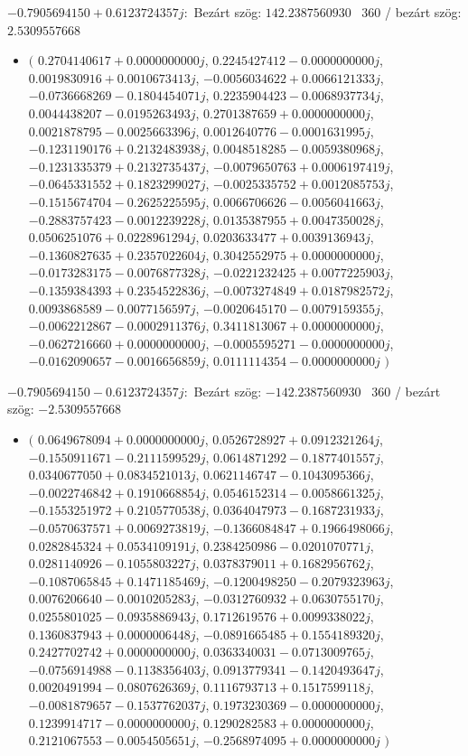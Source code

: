 \documentclass[14pt,a4paper]{article}
\begin{document}
$-0.7905694150+0.6123724357j$:\
Bezárt szög: $142.2387560930$ \
360 / bezárt szög: $2.5309557668$\
\begin{itemize}
\item
$\big($
$0.2704140617+0.0000000000j$, $0.2245427412-0.0000000000j$, $0.0019830916+0.0010673413j$, $-0.0056034622+0.0066121333j$, $-0.0736668269-0.1804454071j$, $0.2235904423-0.0068937734j$, $0.0044438207-0.0195263493j$, $0.2701387659+0.0000000000j$, $0.0021878795-0.0025663396j$, $0.0012640776-0.0001631995j$, $-0.1231190176+0.2132483938j$, $0.0048518285-0.0059380968j$, $-0.1231335379+0.2132735437j$, $-0.0079650763+0.0006197419j$, $-0.0645331552+0.1823299027j$, $-0.0025335752+0.0012085753j$, $-0.1515674704-0.2625225595j$, $0.0066706626-0.0056041663j$, $-0.2883757423-0.0012239228j$, $0.0135387955+0.0047350028j$, $0.0506251076+0.0228961294j$, $0.0203633477+0.0039136943j$, $-0.1360827635+0.2357022604j$, $0.3042552975+0.0000000000j$, $-0.0173283175-0.0076877328j$, $-0.0221232425+0.0077225903j$, $-0.1359384393+0.2354522836j$, $-0.0073274849+0.0187982572j$, $0.0093868589-0.0077156597j$, $-0.0020645170-0.0079159355j$, $-0.0062212867-0.0002911376j$, $0.3411813067+0.0000000000j$, $-0.0627216660+0.0000000000j$, $-0.0005595271-0.0000000000j$, $-0.0162090657-0.0016656859j$, $0.0111114354-0.0000000000j$
$\big)$
\end{itemize}
$-0.7905694150-0.6123724357j$:\
Bezárt szög: $-142.2387560930$ \
360 / bezárt szög: $-2.5309557668$\
\begin{itemize}
\item
$\big($
$0.0649678094+0.0000000000j$, $0.0526728927+0.0912321264j$, $-0.1550911671-0.2111599529j$, $0.0614871292-0.1877401557j$, $0.0340677050+0.0834521013j$, $0.0621146747-0.1043095366j$, $-0.0022746842+0.1910668854j$, $0.0546152314-0.0058661325j$, $-0.1553251972+0.2105770538j$, $0.0364047973-0.1687231933j$, $-0.0570637571+0.0069273819j$, $-0.1366084847+0.1966498066j$, $0.0282845324+0.0534109191j$, $0.2384250986-0.0201070771j$, $0.0281140926-0.1055803227j$, $0.0378379011+0.1682956762j$, $-0.1087065845+0.1471185469j$, $-0.1200498250-0.2079323963j$, $0.0076206640-0.0010205283j$, $-0.0312760932+0.0630755170j$, $0.0255801025-0.0935886943j$, $0.1712619576+0.0099338022j$, $0.1360837943+0.0000006448j$, $-0.0891665485+0.1554189320j$, $0.2427702742+0.0000000000j$, $0.0363340031-0.0713009765j$, $-0.0756914988-0.1138356403j$, $0.0913779341-0.1420493647j$, $0.0020491994-0.0807626369j$, $0.1116793713+0.1517599118j$, $-0.0081879657-0.1537762037j$, $0.1973230369-0.0000000000j$, $0.1239914717-0.0000000000j$, $0.1290282583+0.0000000000j$, $0.2121067553-0.0054505651j$, $-0.2568974095+0.0000000000j$
$\big)$
\end{itemize}
\end{document}
